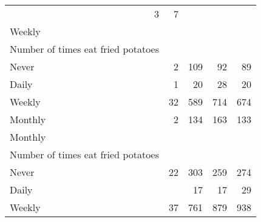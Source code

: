 \documentclass{article}
\begin{document}
\begin{tabular}{lllll}
  \multicolumn{1}{r}{3} &
  \multicolumn{1}{r}{7} \\
\multicolumn{1}{l}{\hspace{3em}Weekly} &
  \multicolumn{1}{|r}{} &
  \multicolumn{1}{r}{} &
  \multicolumn{1}{r}{} &
  \multicolumn{1}{r}{} \\
\multicolumn{1}{l}{\hspace{4em}Number of times eat fried potatoes} &
  \multicolumn{1}{|r}{} &
  \multicolumn{1}{r}{} &
  \multicolumn{1}{r}{} &
  \multicolumn{1}{r}{} \\
\multicolumn{1}{l}{\hspace{5em}Never} &
  \multicolumn{1}{|r}{2} &
  \multicolumn{1}{r}{109} &
  \multicolumn{1}{r}{92} &
  \multicolumn{1}{r}{89} \\
\multicolumn{1}{l}{\hspace{5em}Daily} &
  \multicolumn{1}{|r}{1} &
  \multicolumn{1}{r}{20} &
  \multicolumn{1}{r}{28} &
  \multicolumn{1}{r}{20} \\
\multicolumn{1}{l}{\hspace{5em}Weekly} &
  \multicolumn{1}{|r}{32} &
  \multicolumn{1}{r}{589} &
  \multicolumn{1}{r}{714} &
  \multicolumn{1}{r}{674} \\
\multicolumn{1}{l}{\hspace{5em}Monthly} &
  \multicolumn{1}{|r}{2} &
  \multicolumn{1}{r}{134} &
  \multicolumn{1}{r}{163} &
  \multicolumn{1}{r}{133} \\
\multicolumn{1}{l}{\hspace{3em}Monthly} &
  \multicolumn{1}{|r}{} &
  \multicolumn{1}{r}{} &
  \multicolumn{1}{r}{} &
  \multicolumn{1}{r}{} \\
\multicolumn{1}{l}{\hspace{4em}Number of times eat fried potatoes} &
  \multicolumn{1}{|r}{} &
  \multicolumn{1}{r}{} &
  \multicolumn{1}{r}{} &
  \multicolumn{1}{r}{} \\
\multicolumn{1}{l}{\hspace{5em}Never} &
  \multicolumn{1}{|r}{22} &
  \multicolumn{1}{r}{303} &
  \multicolumn{1}{r}{259} &
  \multicolumn{1}{r}{274} \\
\multicolumn{1}{l}{\hspace{5em}Daily} &
  \multicolumn{1}{|r}{} &
  \multicolumn{1}{r}{17} &
  \multicolumn{1}{r}{17} &
  \multicolumn{1}{r}{29} \\
\multicolumn{1}{l}{\hspace{5em}Weekly} &
  \multicolumn{1}{|r}{37} &
  \multicolumn{1}{r}{761} &
  \multicolumn{1}{r}{879} &
  \multicolumn{1}{r}{938} \\

\end{tabular}
\end{document}
